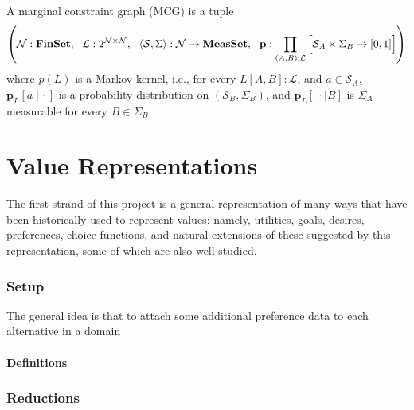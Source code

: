 \documentclass{article}
\begin{document}
	\begin{defn}\label{def:mcg}
		A marginal constraint graph (MCG) is a tuple 
		\[ \left(\mathcal N : \mathbf{FinSet},~~\mathcal L : 2^{\cal N \times N},~~ \langle\mathcal S, \Sigma\rangle : \mathcal N \to \mathbf{MeasSet}, ~~\mathbf p : \prod_{(A,B): \mathcal L} \left[ \Big. \mathcal S_A \times \Sigma_B \to [0,1]\right] \right) \]
		where $p(L)$ is a Markov kernel, i.e., for every $L[A,B] : \mathcal L$, and $a \in \mathcal S_A$, $\mathbf p_L[a \mid \cdot~]$ is a probability distribution on $(\mathcal S_B, \Sigma_B)$, and $\mathbf p_L[~\cdot \mid B]$ is $\Sigma_A$-measurable for every $B \in \Sigma_B$.
	\end{defn}

	\part{Value Representations}
	
	The first strand of this project is a general representation of many ways that have been historically used to represent values: namely, utilities, goals, desires, preferences, choice functions, and natural extensions of these suggested by this representation, some of which are also well-studied. 
	
	\section{Setup}
	
	
	The general idea is that to attach some additional preference data to each alternative in a domain
	
	\subsection{Definitions}
	

	
	\section{Reductions}
	
\end{document}
